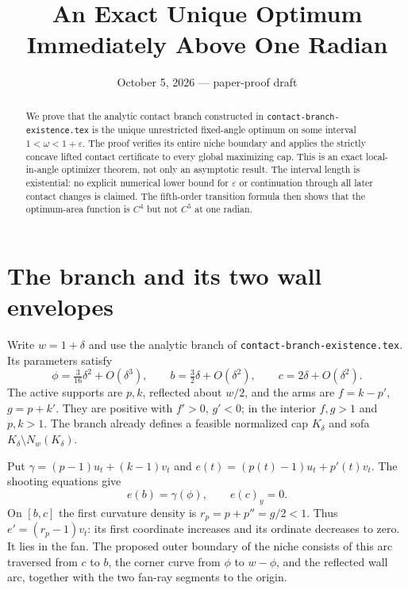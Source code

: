 \documentclass[11pt]{article}
\title{An Exact Unique Optimum Immediately Above One Radian}
\author{}\date{October 5, 2026 --- paper-proof draft}
\begin{document}
\maketitle
\begin{abstract}
We prove that the analytic contact branch constructed in \texttt{contact-branch-existence.tex} is the unique unrestricted fixed-angle optimum on some interval $1<\omega<1+\varepsilon$. The proof verifies its entire niche boundary and applies the strictly concave lifted contact certificate to every global maximizing cap. This is an exact local-in-angle optimizer theorem, not only an asymptotic result. The interval length is existential: no explicit numerical lower bound for $\varepsilon$ or continuation through all later contact changes is claimed. The fifth-order transition formula then shows that the optimum-area function is $C^4$ but not $C^5$ at one radian.
\end{abstract}

\section{The branch and its two wall envelopes}
Write $w=1+\delta$ and use the analytic branch of \texttt{contact-branch-existence.tex}. Its parameters satisfy
\[
 \phi=\tfrac3{16}\delta^2+O(\delta^3),\qquad
 b=\tfrac32\delta+O(\delta^2),\qquad c=2\delta+O(\delta^2).
\]
The active supports are $p,k$, reflected about $w/2$, and the arms are $f=k-p'$, $g=p+k'$. They are positive with $f'>0$, $g'<0$; in the interior $f,g>1$ and $p,k>1$. The branch already defines a feasible normalized cap $K_\delta$ and sofa $K_\delta\setminus N_w(K_\delta)$.

Put $\gamma=(p-1)u_t+(k-1)v_t$ and $e(t)=(p(t)-1)u_t+p'(t)v_t$. The shooting equations give
\[
 e(b)=\gamma(\phi),\qquad e(c)_y=0.
\]
On $[b,c]$ the first curvature density is $r_p=p+p''=g/2<1$. Thus $e'=(r_p-1)v_t$: its first coordinate increases and its ordinate decreases to zero. It lies in the fan. The proposed outer boundary of the niche consists of this arc traversed from $c$ to $b$, the corner curve from $\phi$ to $w-\phi$, and the reflected wall arc, together with the two fan-ray segments to the origin.
\end{document}
